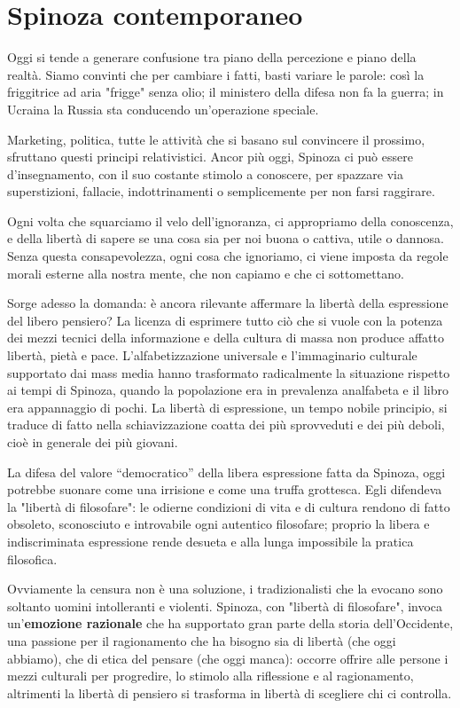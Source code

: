 \chapter{Spinoza contemporaneo}

Oggi si tende a generare confusione tra piano della percezione e piano della realtà. Siamo convinti che per cambiare i fatti, basti variare le parole: così la friggitrice ad aria "frigge" senza olio; il ministero della difesa non fa la guerra; in Ucraina la Russia sta conducendo un'operazione speciale.

Marketing, politica, tutte le attività che si basano sul convincere il prossimo, sfruttano questi principi relativistici. Ancor più oggi, Spinoza ci può essere d'insegnamento, con il suo costante stimolo a conoscere, per spazzare via superstizioni, fallacie, indottrinamenti o semplicemente per non farsi raggirare.

Ogni volta che squarciamo il velo dell'ignoranza, ci appropriamo della conoscenza, e della libertà di sapere se una cosa sia per noi buona o cattiva, utile o dannosa. Senza questa consapevolezza, ogni cosa che ignoriamo, ci viene imposta da regole morali esterne alla nostra mente, che non capiamo e che ci sottomettano.

Sorge adesso la domanda: è ancora rilevante affermare la libertà della espressione del libero pensiero? La licenza di
esprimere tutto ciò che si vuole con la potenza dei mezzi tecnici della informazione e della
cultura di massa non produce affatto libertà, pietà e pace. L'alfabetizzazione universale e
l'immaginario culturale supportato dai mass media hanno
trasformato radicalmente la situazione rispetto ai tempi di Spinoza, quando la popolazione era in
prevalenza analfabeta e il libro era appannaggio di pochi. La libertà di espressione, un tempo nobile
principio, si traduce di fatto nella schiavizzazione coatta dei
più sprovveduti e dei più deboli, cioè in generale dei più giovani.

La difesa del valore
“democratico” della libera espressione fatta da Spinoza, oggi potrebbe suonare come una irrisione e come una truffa grottesca. Egli  difendeva la "libertà di filosofare": le
odierne condizioni di vita e di cultura rendono di fatto obsoleto, sconosciuto e introvabile
ogni autentico filosofare; proprio la libera e indiscriminata espressione
rende desueta e alla lunga impossibile la pratica filosofica.

Ovviamente la censura non è una soluzione, i tradizionalisti che la evocano sono soltanto uomini intolleranti e violenti. Spinoza, con "libertà di filosofare", invoca un'\textbf{emozione razionale} che ha supportato gran parte della storia
dell'Occidente, una passione per il ragionamento che ha bisogno sia di libertà (che oggi abbiamo), che di etica del pensare (che oggi manca): occorre offrire alle persone i mezzi culturali per progredire, lo stimolo alla riflessione e al ragionamento, altrimenti la libertà di pensiero si trasforma in libertà di scegliere chi ci controlla.







\newpage